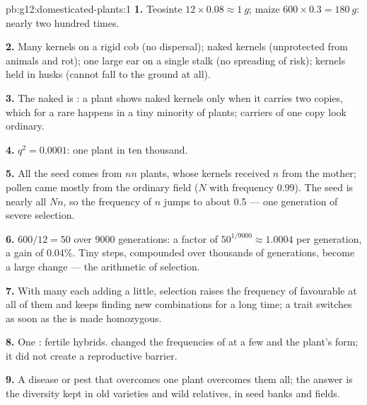 \begin{solution}{pb:g12:domesticated-plants:1}
\textbf{1.} Teosinte $12 \times 0.08 \approx \qty{1}{g}$; maize $600
\times 0.3 = \qty{180}{g}$: nearly two hundred times.

\textbf{2.} Many kernels on a rigid cob (no dispersal); naked kernels
(unprotected from animals and rot); one large ear on a single stalk
(no spreading of risk); kernels held in husks (cannot fall to the
ground at all).

\textbf{3.} The naked  is : a plant shows naked kernels
only when it carries two copies, which for a rare  happens in a
tiny minority of plants; carriers of one copy look ordinary.

\textbf{4.} $q^2 = 0.0001$: one plant in ten thousand.

\textbf{5.} All the seed comes from $nn$ plants, whose kernels received
$n$ from the mother; pollen came mostly from the ordinary field ($N$
with frequency 0.99). The seed is nearly all $Nn$, so the frequency of
$n$ jumps to about 0.5 --- one generation of severe selection.

\textbf{6.} $600/12 = 50$ over 9000 generations: a factor of $50^{1/9000}
\approx 1.0004$ per generation, a gain of 0.04\%. Tiny steps,
compounded over thousands of generations, become a large change ---
the arithmetic of selection.

\textbf{7.} With many  each adding a little, selection raises the
frequency of favourable  at all of them and keeps finding new
combinations for a long time; a  trait switches as soon as
the   is made homozygous.

\textbf{8.} One : fertile hybrids.  changed the
frequencies of  at a few  and the plant's form; it did not
create a reproductive barrier.

\textbf{9.} A disease or pest that overcomes one plant overcomes them
all; the answer is the diversity kept in old varieties and wild
relatives, in seed banks and fields.


\end{solution}
